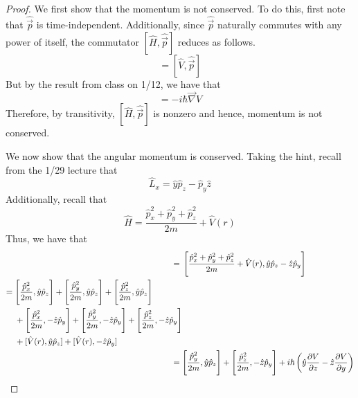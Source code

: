 \documentclass[../psets.tex]{subfiles}
\begin{document}
\begin{enumerate}
\begin{enumerate}
        \begin{proof}
            We first show that the momentum is not conserved. To do this, first note that $\hat{\vec{p}}$ is time-independent. Additionally, since $\hat{\vec{p}}$ naturally commutes with any power of itself, the commutator $[\hat{H},\hat{\vec{p}}]$ reduces as follows.
            \begin{equation*}
                [\hat{H},\hat{\vec{p}}] = [\hat{V},\hat{\vec{p}}]
            \end{equation*}
            But by the result from class on 1/12, we have that
            \begin{equation*}
                [\hat{V},\hat{\vec{p}}] = -i\hbar\vec{\nabla}V
            \end{equation*}
            Therefore, by transitivity, $[\hat{H},\hat{\vec{p}}]$ is nonzero and hence, momentum is not conserved.\par
            We now show that the angular momentum is conserved. Taking the hint, recall from the 1/29 lecture that
            \begin{equation*}
                \hat{L}_x = \hat{y}\hat{p}_z-\hat{p}_y\hat{z}
            \end{equation*}
            Additionally, recall that
            \begin{equation*}
                \hat{H} = \frac{\hat{p}_x^2+\hat{p}_y^2+\hat{p}_z^2}{2m}+\hat{V}(r)
            \end{equation*}
            Thus, we have that
            \begin{align*}
                [\hat{H},\hat{L}_x] ={}& \left[ \frac{\hat{p}_x^2+\hat{p}_y^2+\hat{p}_z^2}{2m}+\hat{V}(r),\hat{y}\hat{p}_z-\hat{z}\hat{p}_y \right]\\
                \begin{split}
                    ={}& \Bigg[ \frac{\hat{p}_x^2}{2m},\hat{y}\hat{p}_z \Bigg]+\Bigg[ \frac{\hat{p}_y^2}{2m},\hat{y}\hat{p}_z \Bigg]+\Bigg[ \frac{\hat{p}_z^2}{2m},\hat{y}\hat{p}_z \Bigg]\\
                    & +\Bigg[ \frac{\hat{p}_x^2}{2m},-\hat{z}\hat{p}_y \Bigg]+\Bigg[ \frac{\hat{p}_y^2}{2m},-\hat{z}\hat{p}_y \Bigg]+\Bigg[ \frac{\hat{p}_z^2}{2m},-\hat{z}\hat{p}_y \Bigg]\\
                    & +[\hat{V}(r),\hat{y}\hat{p}_z]+[\hat{V}(r),-\hat{z}\hat{p}_y]
                \end{split}\\
                ={}& \Bigg[ \frac{\hat{p}_y^2}{2m},\hat{y}\hat{p}_z \Bigg]+\Bigg[ \frac{\hat{p}_z^2}{2m},-\hat{z}\hat{p}_y \Bigg]+i\hbar\left( \hat{y}\pdv{V}{z}-\hat{z}\pdv{V}{y} \right)\\

\end{align*}
\end{proof}
\end{enumerate}
\end{enumerate}
\end{document}
